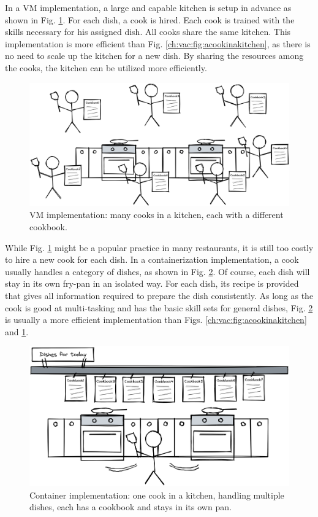 In a VM implementation, a large and capable kitchen is setup in advance as shown in Fig. \ref{ch:vac:fig:manycooksinakitchen}. For each dish, a cook is hired. Each cook is trained with the skills necessary for his assigned dish. All cooks share the same kitchen. This implementation is more efficient than Fig. \ref{ch:vac:fig:acookinakitchen}, as there is no need to scale up the kitchen for a new dish. By sharing the resources among the cooks, the kitchen can be utilized more efficiently.
\begin{figure}[htbp]
	\centering \includegraphics[width=350pt]{chapters/part-3/figures/manycooksinakitchen.png}
	\caption{VM implementation: many cooks in a kitchen, each with a different cookbook.} \label{ch:vac:fig:manycooksinakitchen}
\end{figure}

While Fig. \ref{ch:vac:fig:manycooksinakitchen} might be a popular practice in many restaurants, it is still too costly to hire a new cook for each dish. In a containerization implementation, a cook usually handles a category of dishes, as shown in Fig. \ref{ch:vac:fig:multitaskcook}. Of course, each dish will stay in its own fry-pan in an isolated way. For each dish, its recipe is provided that gives all information required to prepare the dish consistently. As long as the cook is good at multi-tasking and has the basic skill sets for general dishes, Fig. \ref{ch:vac:fig:multitaskcook} is usually a more efficient implementation than Figs. \ref{ch:vac:fig:acookinakitchen} and \ref{ch:vac:fig:manycooksinakitchen}.

\begin{figure}[htbp]
	\centering
	\includegraphics[width=350pt]{chapters/part-3/figures/multitaskcook.png}
	\caption{Container implementation: one cook in a kitchen, handling multiple dishes, each has a cookbook and stays in its own pan.} \label{ch:vac:fig:multitaskcook}
\end{figure}

